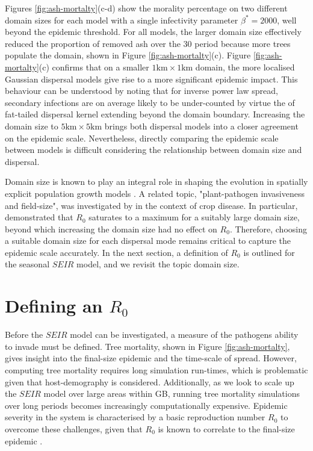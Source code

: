 Figures \ref{fig:ash-mortalty}(c-d) show the morality percentage on two different domain sizes for each model with a single infectivity parameter $\beta^*=2000$, well beyond the epidemic threshold.
For all models, the larger domain size effectively reduced the proportion of removed ash over the $30$ period because more trees populate the domain, shown in Figure \ref{fig:ash-mortalty}(c).
Figure \ref{fig:ash-mortalty}(c) confirms that on a smaller $1\mathrm{km}\times 1\mathrm{km}$ domain, the more localised Gaussian dispersal models give rise to a more significant epidemic impact.
This behaviour can be understood by noting that for inverse power law spread, secondary infections are on average likely to be under-counted
by virtue the of fat-tailed dispersal kernel extending beyond the domain boundary.
Increasing the domain size to $5\mathrm{km}\times 5\mathrm{km}$ brings both dispersal models into a closer agreement on the epidemic scale.
Nevertheless, directly comparing the epidemic scale between models is difficult considering the relationship between domain size and dispersal.

Domain size is known to play an integral role in shaping the evolution in spatially explicit population growth models \cite{tang2011asymptotic}.
A related topic, "plant-pathogen invasiveness and field-size", was investigated by \cite{mikaberidze2016invasiveness} in the context of crop disease.
In particular, \cite{mikaberidze2016invasiveness} demonstrated that $R_0$ saturates to a maximum for a suitably large domain size, beyond which increasing the domain size had no effect on $R_0$.
Therefore, choosing a suitable domain size for each dispersal mode remains critical to capture the epidemic scale accurately.
In the next section, a definition of $R_0$ is outlined for the seasonal $SEIR$ model, and we revisit the topic domain size.

\section{Defining an $R_0$}


Before the $SEIR$ model can be investigated, a measure of the pathogens ability to invade must be defined.
Tree mortality, shown in Figure \ref{fig:ash-mortalty}, gives insight into the final-size epidemic and the time-scale of spread.
However, computing tree mortality requires long simulation run-times, which is problematic given that host-demography is considered.
Additionally, as we look to scale up the $SEIR$ model over large areas within GB, running tree mortality simulations over long periods becomes increasingly computationally expensive.
Epidemic severity in the system is characterised by a basic reproduction number $R_0$ to overcome these challenges,
given that $R_0$ is known to correlate to the final-size epidemic \cite{R0-perc-ref}.

